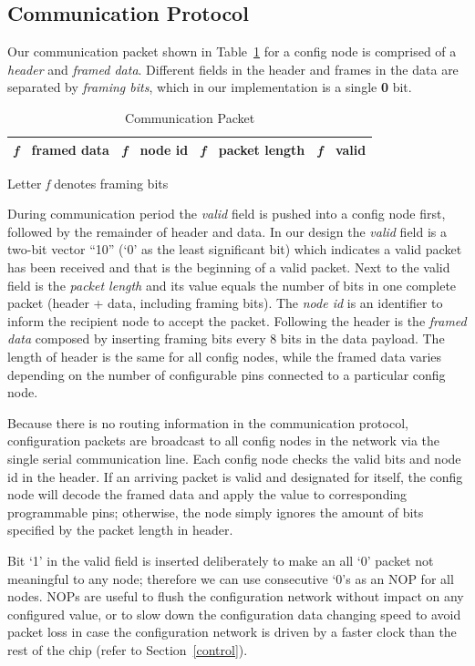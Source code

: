 \documentclass[12pt]{article}
\newcommand{\reftab}[1]{Table~\ref{#1}}
\newcommand{\refsec}[1]{Section~\ref{#1}}
\begin{document}
\subsection{Communication Protocol} \label{protocol}
Our communication packet shown in \reftab{tab:protocol} for a config node is
comprised of a \textit{header} and \textit{framed data}. Different fields in
the header and frames in the data are separated by \textit{framing bits}, which
in our implementation is a single \textbf{0} bit.
\begin{table}[h]
\centering
  \begin{tabular}{ | c | c || c | c | c | c | c | c | }
  \hline
    \textit{f} & framed data & \textit{f} & node id & \textit{f} & packet length & \textit{f} & valid \\ \hline
  \end{tabular}
\caption{Communication Packet}{Letter \textit{f} denotes framing bits}
\label{tab:protocol}
\end{table}
During communication period the \textit{valid} field is pushed into a config
node first, followed by the remainder of header and data. In our design the
\textit{valid} field is a two-bit vector ``10'' (`0' as the least significant
bit) which indicates a valid packet has been received and that is the beginning
of a valid packet. Next to the valid field is the \textit{packet length} and
its value equals the number of bits in one complete packet (header + data,
including framing bits). The \textit{node id} is an identifier to inform the
recipient node to accept the packet. Following the header is the \textit{framed
data} composed by inserting framing bits every 8 bits in the data payload. The
length of header is the same for all config nodes, while the framed data varies
depending on the number of configurable pins connected to a particular config
node.

Because there is no routing information in the communication protocol,
configuration packets are broadcast to all config nodes in the network via the
single serial communication line. Each config node checks the valid bits and
node id in the header. If an arriving packet is valid and designated for
itself, the config node will decode the framed data and apply the value to
corresponding programmable pins; otherwise, the node simply ignores the amount
of bits specified by the packet length in header.

Bit `1' in the valid field is inserted deliberately to make an all `0' packet
not meaningful to any node; therefore we can use consecutive `0's as an NOP for
all nodes. NOPs are useful to flush the configuration network without impact on
any configured value, or to slow down the configuration data changing speed to
avoid packet loss in case the configuration network is driven by a faster clock
than the rest of the chip (refer to \refsec{control}).
\end{document}

